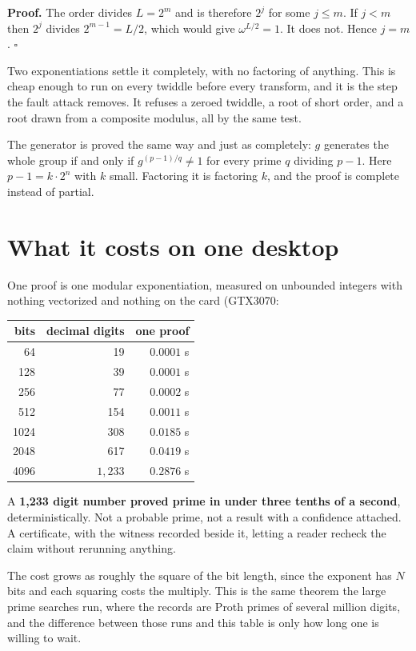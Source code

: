 \documentclass{article}
\begin{document}
\textbf{Proof.} The order divides \(L = 2^m\) and is therefore \(2^j\) for some \(j \le m\). If \(j < m\) then \(2^j\) divides \(2^{m-1} = L/2\), which would give \(\omega^{L/2} = 1\). It does not. Hence \(j = m\). \(\square\)

Two exponentiations settle it completely, with no factoring of anything. This is cheap enough to run on every twiddle before every transform, and it is the step the fault attack removes. It refuses a zeroed twiddle, a root of short order, and a root drawn from a composite modulus, all by the same test.

The generator is proved the same way and just as completely: \(g\) generates the whole group if and only if \(g^{(p-1)/q} \ne 1\) for every prime \(q\) dividing \(p-1\). Here \(p - 1 = k \cdot 2^n\) with \(k\) small. Factoring it is factoring \(k\), and the proof is complete instead of partial.

\section{What it costs on one desktop}

One proof is one modular exponentiation, measured on unbounded integers with nothing vectorized and nothing on the card (GTX3070:

\begin{center}
\begin{tabular}{@{}rrr@{}}
\toprule
bits & decimal digits & one proof \\
\midrule
64 & 19 & \(0.0001\) s \\
128 & 39 & \(0.0001\) s \\
256 & 77 & \(0.0002\) s \\
512 & 154 & \(0.0011\) s \\
1024 & 308 & \(0.0185\) s \\
2048 & 617 & \(0.0419\) s \\
4096 & \(1{,}233\) & \(0.2876\) s \\
\bottomrule
\end{tabular}
\end{center}

A \textbf{1,233 digit number proved prime in under three tenths of a second}, deterministically. Not a probable prime, not a result with a confidence attached. A certificate, with the witness recorded beside it, letting a reader recheck the claim without rerunning anything.

The cost grows as roughly the square of the bit length, since the exponent has \(N\) bits and each squaring costs the multiply. This is the same theorem the large prime searches run, where the records are Proth primes of several million digits, and the difference between those runs and this table is only how long one is willing to wait.
\end{document}
